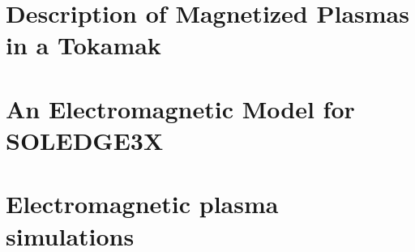 \documentclass[english]{amu_these}
\begin{document}
	
										





	\tableofcontents					%
	\listoffigures						%
	\listoftables						%
	\printglossary[						%
		type=\acronymtype,
		title={List of acronymes},
		toctitle={List of acronymes}
		]
	\printglossary[						%
		title={Glossary},
		toctitle={Glossary}
		]
	\printglossary[						%
		type=notation,
		title={Naming convention},
		toctitle={Naming convention}
		]

	\ohead{\leftmark\Ifstr{\rightmark}{\leftmark}{}{ -- \rightmark}}	%
	
	\clearpage
	
	
	
	\part[Description of Magnetized Plasmas in a Tokamak]{Description of Magnetized Plasmas in a Tokamak}
	\label{part:FundamentalsPlasmaSimulations}
	
	
	

	\part[An Electromagnetic Model for SOLEDGE3X]{An Electromagnetic Model for SOLEDGE3X}
	\label{part:ElectromagneticModel}
	
	
	
	
	\part[Electromagnetic plasma simulations]{Electromagnetic plasma simulations}
	\label{part:EM_Impact}
	
	
	

	

	\appendix

	\newpage
	\printbibliography[heading=bibintoc] %
	
	\newpage
	\printindex							%
	
	\newpage
	\printendnotes						%

\end{document}
